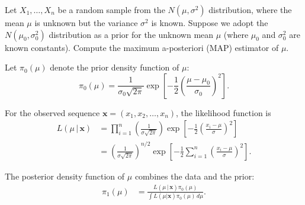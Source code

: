 \begin{exercise}
\begin{questions}
\question 
Let $X_1,\ldots,X_n$ be a random sample from the $N(\mu,\sigma^2)$ distribution, where the mean $\mu$ is unknown but the variance $\sigma^2$ is known. Suppose we adopt the $N(\mu_0,\sigma_0^2)$ distribution as a prior for the unknown mean $\mu$ (where $\mu_0$ and $\sigma_0^2$ are known constants). Compute the maximum a-posteriori (MAP) estimator of $\mu$.

\begin{answer}
Let $\pi_0(\mu)$ denote the prior density function of $\mu$:
\[
\pi_0(\mu) = \frac{1}{\sigma_0\sqrt{2\pi}}\exp\left[-\frac{1}{2}\left(\frac{\mu-\mu_0}{\sigma_0}\right)^2\right].
\]

For the observed sequence $\mathbf{x}=(x_1,x_2,\ldots,x_n)$, the likelihood function is
\begin{align*}
L(\mu\,|\,\mathbf{x}) 
	& = \prod_{i=1}^n \left(\frac{1}{\sigma\sqrt{2\pi}}\right)\exp\left[-\frac{1}{2}\left(\frac{x_i-\mu}{\sigma}\right)^2\right] \\
	& = \left(\frac{1}{\sigma\sqrt{2\pi}}\right)^{n/2}\exp\left[-\frac{1}{2}\sum_{i=1}^n\left(\frac{x_i-\mu}{\sigma}\right)^2\right].
\end{align*}

The posterior density function of $\mu$ combines the data and the prior:
\begin{align*}
\pi_1(\mu)	
	& = \frac{L(\mu\,|\,\mathbf{x})\pi_0(\mu)}{\int L(\mu|\mathbf{x})\pi_0(\mu)\,d\mu}.
\end{align*}


\end{answer}
\end{questions}
\end{exercise}
